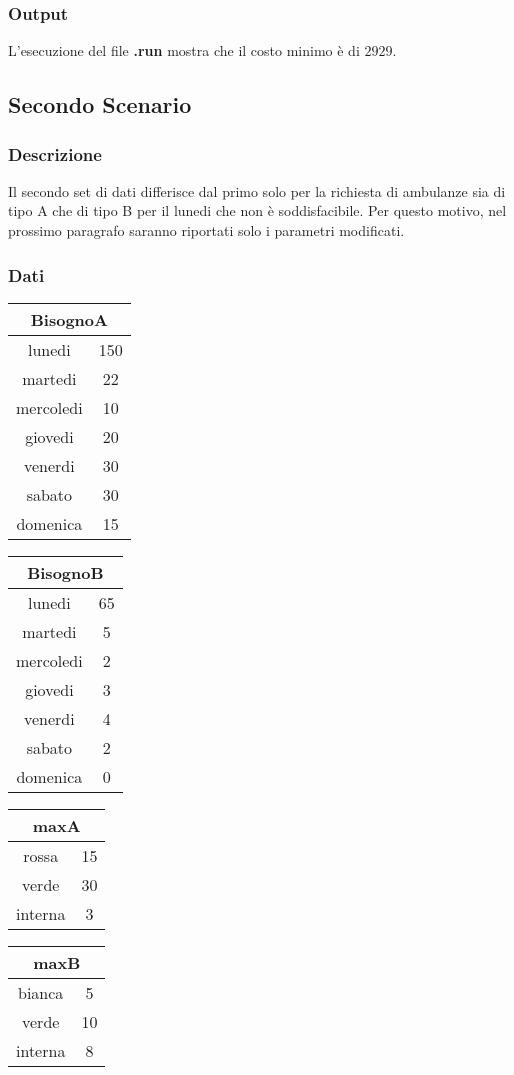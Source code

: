\subsubsection{Output}
L'esecuzione del file \textbf{.run} mostra che il costo minimo è di \texteuro$2929$.

\subsection{Secondo Scenario}
\subsubsection{Descrizione}
Il secondo set di dati differisce dal primo solo per la richiesta di ambulanze sia di tipo A che di tipo B per il lunedi che non è soddisfacibile. Per questo motivo, nel prossimo paragrafo saranno riportati solo i parametri modificati.
\subsubsection{Dati}
\begin{center}
\begin{tabular}{| c | c |}
    \hline
    \multicolumn{2}{|c|}{BisognoA}\\
    \hline \hline
    lunedi & 150 \\
    martedi & 22 \\
    mercoledi & 10 \\
    giovedi & 20 \\
    venerdi & 30 \\
    sabato & 30 \\
    domenica & 15 \\
    \hline
\end{tabular}
\begin{tabular}{| c | c |}
    \hline
    \multicolumn{2}{|c|}{BisognoB}\\
    \hline \hline
    lunedi & 65 \\
    martedi & 5 \\
    mercoledi & 2 \\
    giovedi & 3 \\
    venerdi & 4 \\
    sabato & 2 \\
    domenica & 0 \\
    \hline
\end{tabular}
\begin{tabular}{| c | c |}
    \hline
    \multicolumn{2}{|c|}{maxA}\\
    \hline \hline
    rossa & 15 \\
    verde & 30 \\
    interna & 3 \\
    \hline    
\end{tabular}
\begin{tabular}{| c | c |}
    \hline
    \multicolumn{2}{|c|}{maxB} \\
    \hline \hline
    bianca & 5 \\
    verde & 10 \\
    interna & 8 \\
    \hline    
\end{tabular}
\end{center}
